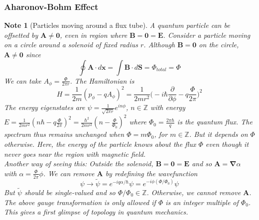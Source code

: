 \documentclass[a4paper]{article}
\newtheorem{Note}{Note}[section]
\theoremstyle{new}
\begin{document}
\subsubsection{Aharonov-Bohm Effect}
\begin{Note}[Particles moving around a flux tube]
A quantum particle can be offsetted by $\mathbf{A}\neq\boldsymbol{0}$, even in region where $\mathbf{B}=\boldsymbol{0}=\mathbf{E}$. Consider a particle moving on a circle around a solenoid of fixed radius $r$. Although $\mathbf{B}=\boldsymbol{0}$ on the circle, $\mathbf{A}\neq\boldsymbol{0}$ since
$$\oint\mathbf{A}\cdot d\mathbf{x}=\int\mathbf{B}\cdot d\mathbf{S}=\Phi_{total}=\Phi$$
We can take $A_\phi=\frac{\Phi}{2\pi r}$. The Hamiltonian is 
$$H=\frac{1}{2m}(p_\phi-qA_\phi)^2=\frac{1}{2mr^2}\bigg(-i\hbar\frac{\partial}{\partial\phi}-q\frac{\Phi}{2\pi}\bigg)^2$$
The energy eigenstates are $\psi=\frac{1}{\sqrt{2\pi r}}e^{in\phi}$, $n\in\mathbb{Z}$ with energy $E=\frac{1}{2mr^2}(n\hbar -q\frac{\Phi}{2\pi})^2=\frac{\hbar^2}{2mr^2}(n-\frac{\Phi}{\Phi_0})^2$ where $\Phi_0=\frac{2\pi\hbar}{q}$ is the quantum flux. The spectrum thus remains unchanged when $\Phi=m\Phi_0$, for $m\in\mathbb{Z}$. But it depends on $\Phi$ otherwise. Here, the energy of the particle knows about the flux $\Phi$ even though it never goes near the region with magnetic field.\\[5pt]
Another way of seeing this: Outside the solenoid, $\mathbf{B}=\boldsymbol{0}=\mathbf{E}$ and so $\mathbf{A}=\boldsymbol{\nabla}\alpha$ with $\alpha=\frac{\Phi}{2\pi}\phi$. We can remove $\mathbf{A}$ by redefining the wavefunction
$$\psi\rightarrow\tilde{\psi}=e^{-iq\alpha/\hbar}\psi=e^{-i\phi(\Phi/\Phi_0)}\psi$$
But $\tilde{\psi}$ should be single-valued and so $\Phi/\Phi_0\in\mathbb{Z}$. Otherwise, we cannot remove $\mathbf{A}$. The above gauge transformation is only allowed if $\Phi$ is an integer multiple of $\Phi_0$. This gives a first glimpse of topology in quantum mechanics.
\end{Note}
\end{document}
